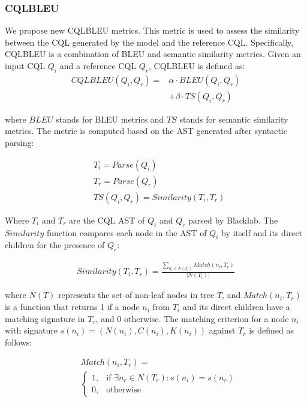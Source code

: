 \documentclass[11pt]{article}
\begin{document}
\begin{CJK*}{UTF8}{gbsn}
\subsubsection{CQLBLEU}

We propose new CQLBLEU metrics. This metric is used to assess the similarity between the CQL generated by the model and the reference CQL. Specifically, CQLBLEU is a combination of BLEU\citep{papineni2002bleu} and semantic similarity metrics. Given an input CQL $Q_{i}$ and a reference CQL $Q_{r}$, CQLBLEU is defined as:
\begin{equation}
\begin{aligned}
CQLBLEU(Q_{i},Q_{r}) =& \alpha\cdot BLEU(Q_{i},Q_{r}) \\ &+ \beta\cdot TS(Q_{i},Q_{r})
\end{aligned}
\end{equation}

where $BLEU$ stands for BLEU metrics and $TS$ stands for semantic similarity metrics. The metric is computed based on the AST generated after syntactic parsing:

\begin{align}
    &T_i = Parse(Q_i) \\
    &T_r = Parse(Q_r) \\
    &TS(Q_{i},Q_{r}) = Similarity(T_i,T_r) 
\end{align}


Where $T_i$ and $T_r$ are the CQL AST of $Q_i$ and $Q_r$ parsed by Blacklab. The $Similarity$ function compares each node in the AST of $Q_i$ by itself and its direct children for the presence of $Q_r$:

\begin{align}
    Similarity(T_i, T_r)=     \frac{\sum_{n_i \in N(T_i)} Match(n_i, T_r)}{|N(T_i)|}
\end{align}

where $N(T)$ represents the set of non-leaf nodes in tree $T$, and $Match(n_i, T_r)$ is a function that returns 1 if a node $n_i$ from $T_i$ and its direct children have a matching signature in $T_r$, and 0 otherwise. The matching criterion for a node $n_i$ with signature $s(n_i) = (N(n_i), C(n_i), K(n_i))$ against $T_r$ is defined as follows:

\begin{equation}
\begin{aligned}
    & Match(n_i, T_r) = \\ &\begin{cases}
    1, & \text{if } \exists n_r \in N(T_r) : s(n_i) = s(n_r) \\
    0, & \text{otherwise}
    \end{cases}
\end{aligned}
\end{equation}


\end{CJK*}
\end{document}
